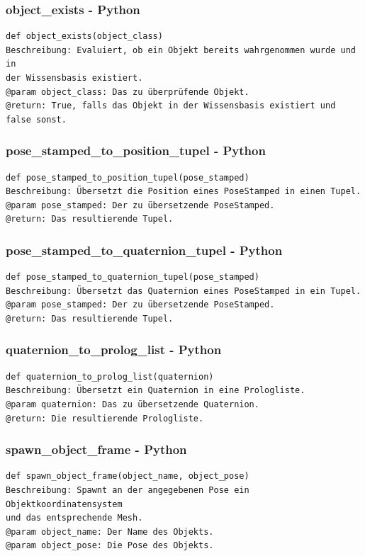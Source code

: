 \documentclass{suturo}
\begin{document}
\subsubsection{object\_exists - Python}
\begin{verbatim}
def object_exists(object_class)
Beschreibung: Evaluiert, ob ein Objekt bereits wahrgenommen wurde und in 
der Wissensbasis existiert.
@param object_class: Das zu überprüfende Objekt.
@return: True, falls das Objekt in der Wissensbasis existiert und false sonst.
\end{verbatim}

\subsubsection{pose\_stamped\_to\_position\_tupel - Python}
\begin{verbatim}
def pose_stamped_to_position_tupel(pose_stamped)
Beschreibung: Übersetzt die Position eines PoseStamped in einen Tupel.
@param pose_stamped: Der zu übersetzende PoseStamped.
@return: Das resultierende Tupel.
\end{verbatim}

\subsubsection{pose\_stamped\_to\_quaternion\_tupel - Python}
\begin{verbatim}
def pose_stamped_to_quaternion_tupel(pose_stamped)
Beschreibung: Übersetzt das Quaternion eines PoseStamped in ein Tupel.
@param pose_stamped: Der zu übersetzende PoseStamped.
@return: Das resultierende Tupel.
\end{verbatim}

\subsubsection{quaternion\_to\_prolog\_list - Python}
\begin{verbatim}
def quaternion_to_prolog_list(quaternion)
Beschreibung: Übersetzt ein Quaternion in eine Prologliste.
@param quaternion: Das zu übersetzende Quaternion.
@return: Die resultierende Prologliste.
\end{verbatim}

\subsubsection{spawn\_object\_frame - Python}
\begin{verbatim}
def spawn_object_frame(object_name, object_pose)
Beschreibung: Spawnt an der angegebenen Pose ein Objektkoordinatensystem 
und das entsprechende Mesh.
@param object_name: Der Name des Objekts.
@param object_pose: Die Pose des Objekts.
\end{verbatim}
\end{document}

